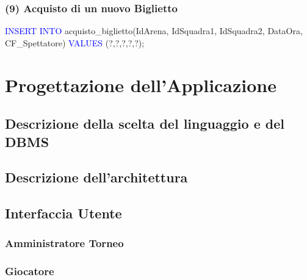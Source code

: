\documentclass[a4paper,12pt]{report}
\begin{document}
\subsection*{(9) Acquisto di un nuovo Biglietto}
\textcolor{blue}{INSERT INTO} acquisto\_biglietto(IdArena, IdSquadra1, IdSquadra2, DataOra, CF\_Spettatore)
\textcolor{blue}{VALUES} (?,?,?,?,?);

\chapter{Progettazione dell'Applicazione}
\section{Descrizione della scelta del linguaggio e del DBMS}
\section{Descrizione dell'architettura}
\section{Interfaccia Utente}
\subsection{Amministratore Torneo}
\subsection{Giocatore}
\end{document}

